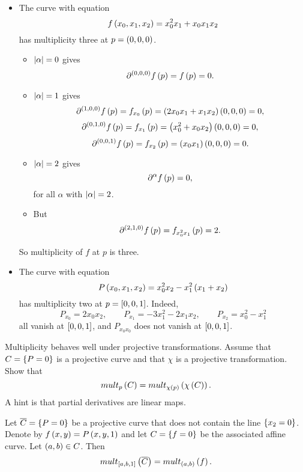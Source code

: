 \begin{example}
\hfill
\begin{itemize}
\item The curve with equation
$$ f\rb{x_0, x_1, x_2} = x_0^2x_1 + x_0x_1x_2 $$
has multiplicity three at $ p = \rb{0, 0, 0} $.
\begin{itemize}
\item $ \abs{\alpha} = 0 $ gives
$$ \partial^{\rb{0, 0, 0}} f\rb{p} = f\rb{p} = 0. $$
\item $ \abs{\alpha} = 1 $ gives
$$ \partial^{\rb{1, 0, 0}} f\rb{p} = f_{x_0}\rb{p} = \rb{2x_0x_1 + x_1x_2}\rb{0, 0, 0} = 0, $$
$$ \partial^{\rb{0, 1, 0}} f\rb{p} = f_{x_1}\rb{p} = \rb{x_0^2 + x_0x_2}\rb{0, 0, 0} = 0, $$
$$ \partial^{\rb{0, 0, 1}} f\rb{p} = f_{x_2}\rb{p} = \rb{x_0x_1}\rb{0, 0, 0} = 0. $$
\item $ \abs{\alpha} = 2 $ gives
$$ \partial^\alpha f\rb{p} = 0, $$
for all $ \alpha $ with $ \abs{\alpha} = 2 $.
\item But
$$ \partial^{\rb{2, 1, 0}} f\rb{p} = f_{x_0^2x_1}\rb{p} = 2. $$
\end{itemize}
So multiplicity of $ f $ at $ p $ is three.
\item The curve with equation
$$ P\rb{x_0, x_1, x_2} = x_0^2x_2 - x_1^2\rb{x_1 + x_2} $$
has multiplicity two at $ p = \sb{0, 0, 1} $. Indeed,
$$ P_{x_0} = 2x_0x_2, \qquad P_{x_1} = -3x_1^2 - 2x_1x_2, \qquad P_{x_2} = x_0^2 - x_1^2 $$
all vanish at $ \sb{0, 0, 1} $, and $ P_{x_0x_0} $ does not vanish at $ \sb{0, 0, 1} $.
\end{itemize}
\end{example}

\pagebreak

\begin{exercise}
\label{ex:32}
Multiplicity behaves well under projective transformations. Assume that $ C = \cb{P = 0} $ is a projective curve and that $ \chi $ is a projective transformation. Show that
$$ mult_p\rb{C} = mult_{\chi\rb{p}}\rb{\chi\rb{C}}. $$
A hint is that partial derivatives are linear maps.
\end{exercise}

\begin{exercise}
\label{ex:33}
Let $ \overline{C} = \cb{P = 0} $ be a projective curve that does not contain the line $ \cb{x_2 = 0} $. Denote by $ f\rb{x, y} = P\rb{x, y, 1} $ and let $ C = \cb{f = 0} $ be the associated affine curve. Let $ \rb{a, b} \in C $. Then
$$ mult_{\sb{a, b, 1}}\rb{\overline{C}} = mult_{\rb{a, b}}\rb{f}. $$
\end{exercise}

